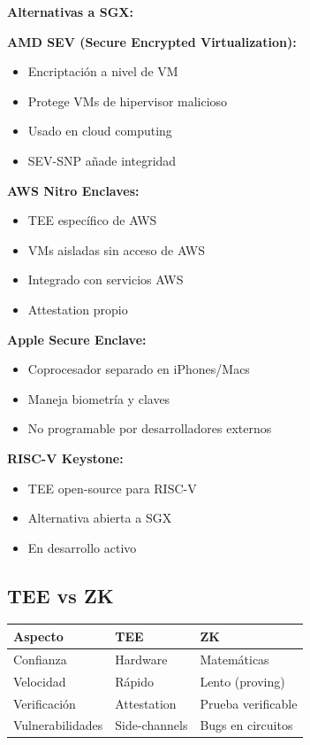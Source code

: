 \documentclass[11pt,a4paper,twoside]{book}
\begin{document}
\begin{remark}
\textbf{Alternativas a SGX:}

\textbf{AMD SEV (Secure Encrypted Virtualization):}
\begin{itemize}
    \item Encriptaci\'on a nivel de VM
    \item Protege VMs de hipervisor malicioso
    \item Usado en cloud computing
    \item SEV-SNP a\~nade integridad
\end{itemize}

\textbf{AWS Nitro Enclaves:}
\begin{itemize}
    \item TEE espec\'ifico de AWS
    \item VMs aisladas sin acceso de AWS
    \item Integrado con servicios AWS
    \item Attestation propio
\end{itemize}

\textbf{Apple Secure Enclave:}
\begin{itemize}
    \item Coprocesador separado en iPhones/Macs
    \item Maneja biometr\'ia y claves
    \item No programable por desarrolladores externos
\end{itemize}

\textbf{RISC-V Keystone:}
\begin{itemize}
    \item TEE open-source para RISC-V
    \item Alternativa abierta a SGX
    \item En desarrollo activo
\end{itemize}
\end{remark}

\subsection{TEE vs ZK}

\begin{center}
\begin{tabular}{lll}
\toprule
\textbf{Aspecto} & \textbf{TEE} & \textbf{ZK} \\
\midrule
Confianza & Hardware & Matem\'aticas \\
Velocidad & R\'apido & Lento (proving) \\
Verificaci\'on & Attestation & Prueba verificable \\
Vulnerabilidades & Side-channels & Bugs en circuitos \\
\bottomrule
\end{tabular}
\end{center}
\end{document}
